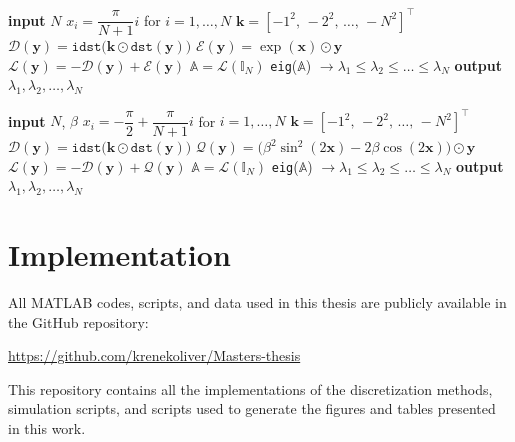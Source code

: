 \documentclass[11pt,a4paper,oneside,openright]{report} %
\begin{document}
\begin{algorithm}[H]
\caption{Discrete Sine Transform - Paine equation}
\label{alg_DST_Paine}
{\small
\begin{algorithmic}[1]
\State \textbf{input} $N$
\State $x_i = \dfrac{\pi}{N+1} i$ \quad for $i = 1, \dots,N$
\State $\boldsymbol{k} = [-1^2, \, -2^2, \, \dots, \, -N^2]^\top$
\BlankLine
\State $\mathcal{D}(\boldsymbol{y}) = \texttt{idst}\big(\boldsymbol{k} \odot \texttt{dst}(\boldsymbol{y})\big)$
\State $\mathcal{E}(\boldsymbol{y}) = \exp(\boldsymbol{x}) \odot \boldsymbol{y}$
\State $\mathcal{L}(\boldsymbol{y}) = -\mathcal{D}(\boldsymbol{y}) + \mathcal{E}(\boldsymbol{y})$
\State $\mathbb{A} = \mathcal{L}(\mathbb{I}_{N})$
\BlankLine
\State \texttt{eig}($\mathbb{A}$) $ \to \lambda_1 \leq \lambda_2 \leq \dots \leq \lambda_{N}$
\State \textbf{output} $\lambda_1, \lambda_2, \dots, \lambda_{N}$
\end{algorithmic}
}
\end{algorithm}

\begin{algorithm}[H]
\caption{Discrete Sine Transform - Coffey--Evans equation}
\label{alg_DST_CE}
{\small
\begin{algorithmic}[1]
\State \textbf{input} $N$, $\beta$
\State $x_i = -\dfrac{\pi}{2} + \dfrac{\pi}{N+1} i$ \quad for $i = 1, \dots,N$
\State $\boldsymbol{k} = [-1^2, \, -2^2, \, \dots, \, -N^2]^\top$
\BlankLine
\State $\mathcal{D}(\boldsymbol{y}) = \texttt{idst}\big(\boldsymbol{k} \odot \texttt{dst}(\boldsymbol{y})\big)$
\State $\mathcal{Q}(\boldsymbol{y}) = \big( \beta^2 \sin^2(2 \boldsymbol{x}) - 2 \beta \cos(2 \boldsymbol{x}) \big) \odot \boldsymbol{y}$
\State $\mathcal{L}(\boldsymbol{y}) = -\mathcal{D}(\boldsymbol{y}) + \mathcal{Q}(\boldsymbol{y})$
\State $\mathbb{A} = \mathcal{L}(\mathbb{I}_{N})$
\BlankLine
\State \texttt{eig}($\mathbb{A}$) $ \to \lambda_1 \leq \lambda_2 \leq \dots \leq \lambda_{N}$
\State \textbf{output} $\lambda_1, \lambda_2, \dots, \lambda_{N}$
\end{algorithmic}
}
\end{algorithm}

\section{Implementation}
\noindent
All MATLAB codes, scripts, and data used in this thesis are publicly available in the GitHub repository:
\begin{center}
    \url{https://github.com/krenekoliver/Masters-thesis}
\end{center}
This repository contains all the implementations of the discretization methods, simulation scripts, and scripts used to generate the figures and tables presented in this work.
\end{document}
